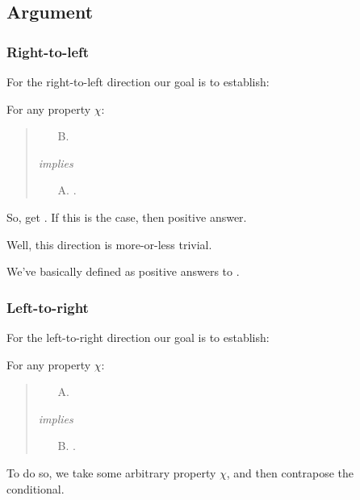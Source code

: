 \subsection{Argument}
\label{sec:argument}

\subsubsection{Right-to-left}
\label{sec:right-left}

\begin{note}
  For the right-to-left direction our goal is to establish:

  For any property \(\chi\):
  \begin{quote}
  \begin{enumerate}
    \item[B.]
    \end{enumerate}
    \emph{implies}
    \begin{enumerate}
    \item[A.]
      .
    \end{enumerate}
  \end{quote}
\end{note}

\begin{note}
  So, get \fc{}.
  If this is the case, then positive answer.

  Well, this direction is more-or-less trivial.

  We've basically defined  as positive answers to \qzS{}.
\end{note}

\subsubsection{Left-to-right}
\label{sec:left-right}

\begin{note}
  For the left-to-right direction our goal is to establish:

  For any property \(\chi\):
  \begin{quote}
  \begin{enumerate}
    \item[A.]
    \end{enumerate}
    \emph{implies}
    \begin{enumerate}
    \item[B.]
      .
    \end{enumerate}
  \end{quote}

  To do so, we take some arbitrary property \(\chi\), and then contrapose the conditional.
\end{note}

